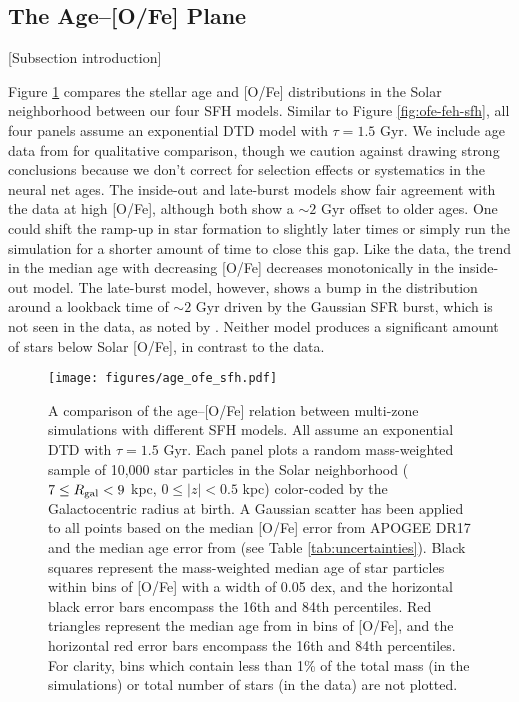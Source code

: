 \documentclass[twocolumn,twocolappendix,linenumbers,trackchanges]{aastex631}
\begin{document}
\subsection{The Age--[O/Fe] Plane}
\label{sec:age-ofe}

[Subsection introduction]

Figure \ref{fig:age-ofe-sfh} compares the stellar age and [O/Fe] distributions in the Solar neighborhood between our four SFH models. Similar to Figure \ref{fig:ofe-feh-sfh}, all four panels assume an exponential DTD model with $\tau=1.5$ Gyr. We include age data from \citet{Leung2023-Ages} for qualitative comparison, though we caution against drawing strong conclusions because we don't correct for selection effects or systematics in the neural net ages. The inside-out and late-burst models show fair agreement with the data at high [O/Fe], although both show a $\sim2$ Gyr offset to older ages. One could shift the ramp-up in star formation to slightly later times or simply run the simulation for a shorter amount of time to close this gap. Like the data, the trend in the median age with decreasing [O/Fe] decreases monotonically in the inside-out model. The late-burst model, however, shows a bump in the distribution around a lookback time of $\sim2$ Gyr driven by the Gaussian SFR burst, which is not seen in the data, as noted by \citet{Johnson2021-Migration}. Neither model produces a significant amount of stars below Solar [O/Fe], in contrast to the data.

\begin{figure}
    \centering
    \texttt{[image: figures/age\_ofe\_sfh.pdf]}
    \caption{A comparison of the age--[O/Fe] relation between multi-zone simulations with different SFH models. All assume an exponential DTD with $\tau=1.5$ Gyr. Each panel plots a random mass-weighted sample of 10,000 star particles in the Solar neighborhood ($7\leq R_{\rm gal}<9$ kpc, $0\leq|z|<0.5$ kpc) color-coded by the Galactocentric radius at birth. A Gaussian scatter has been applied to all points based on the median [O/Fe] error from APOGEE DR17 and the median age error from \citet{Leung2023-Ages} (see Table \ref{tab:uncertainties}). Black squares represent the mass-weighted median age of star particles within bins of [O/Fe] with a width of 0.05 dex, and the horizontal black error bars encompass the 16th and 84th percentiles. Red triangles represent the median age from \citet{Leung2023-Ages} in bins of [O/Fe], and the horizontal red error bars encompass the 16th and 84th percentiles. For clarity, bins which contain less than 1\% of the total mass (in the simulations) or total number of stars (in the data) are not plotted.}
    \label{fig:age-ofe-sfh}
\end{figure}
\end{document}
